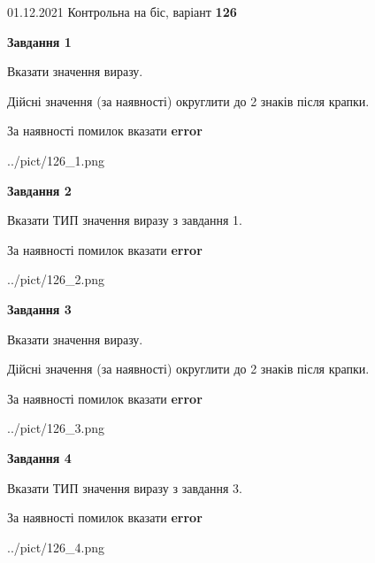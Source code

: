\documentclass[11pt, ukrainian]{article}
\begin{document}
{01.12.2021 Контрольна на біс, варіант  \No \textbf { 126 }\par}
{
\begin {large}
{\begin {center}\textbf{Завдання 1}\end {center}}\par
Вказати значення виразу. \par
Дійсні значення (за наявності) округлити до 2 знаків після крапки. \par
За наявності помилок вказати \textbf{error}

\begin{center}
	{../pict/126_1.png}
\end{center}
\newpage

{\begin {center}\textbf{Завдання 2}\end {center}}\par
Вказати ТИП значення виразу з завдання 1. \par
За наявності помилок вказати \textbf{error}

\begin{center}
	{../pict/126_2.png}
\end{center}
\newpage

{\begin {center}\textbf{Завдання 3}\end {center}}\par
Вказати значення виразу. \par
Дійсні значення (за наявності) округлити до 2 знаків після крапки. \par
За наявності помилок вказати \textbf{error}

\begin{center}
	{../pict/126_3.png}
\end{center}
\newpage

{\begin {center}\textbf{Завдання 4}\end {center}}\par
Вказати ТИП значення виразу з завдання 3. \par
За наявності помилок вказати \textbf{error}

\begin{center}
	{../pict/126_4.png}
\end{center}
\newpage


\end{large}}
\end{document}
